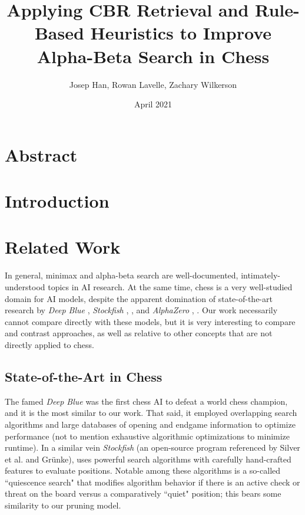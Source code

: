 \documentclass[letterpaper]{article}
\title{Applying CBR Retrieval and Rule-Based Heuristics to Improve Alpha-Beta Search in Chess}
\author{Josep Han, Rowan Lavelle, Zachary Wilkerson}
\date{April 2021}
\begin{document}
\maketitle
\section{Abstract}
\section{Introduction}
\section{Related Work}
In general, minimax and alpha-beta search are well-documented, intimately-understood topics in AI research.  At the same time, chess is a very well-studied domain for AI models, despite the apparent domination of state-of-the-art research by \textit{Deep Blue} \cite{campbell-et-al2002}, \textit{Stockfish} \cite{silver-et-al17}, \cite{grunke2020}, and \textit{AlphaZero} \cite{silver-et-al17}, \cite{grunke2020}.  Our work necessarily cannot compare directly with these models, but it is very interesting to compare and contrast approaches, as well as relative to other concepts that are not directly applied to chess.

\subsection{State-of-the-Art in Chess}
The famed \textit{Deep Blue} \cite{campbell-et-al2002} was the first chess AI to defeat a world chess champion, and it is the most similar to our work.  That said, it employed overlapping search algorithms and large databases of opening and endgame information to optimize performance (not to mention exhaustive algorithmic optimizations to minimize runtime).  In a similar vein \textit{Stockfish} (an open-source program referenced by Silver et al. and Grünke), uses powerful search algorithms with carefully hand-crafted features to evaluate positions.  Notable among these algorithms is a so-called ``quiescence search" that modifies algorithm behavior if there is an active check or threat on the board versus a comparatively ``quiet" position; this bears some similarity to our pruning model.
\end{document}
